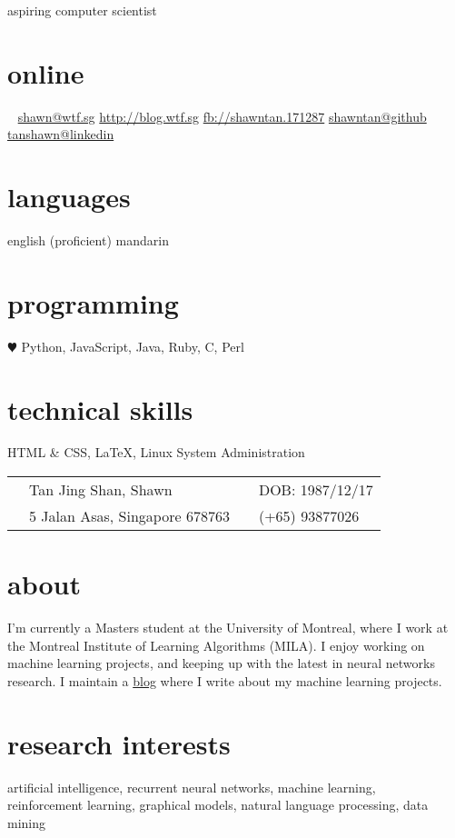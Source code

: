 \documentclass[]{friggeri-cv}
\begin{document}
{aspiring computer scientist

}

\begin{aside}
	\section{online}
	\Email~ \href{mailto:shawn@wtf.sg}{shawn@wtf.sg}
	\href{https://blog.wtf.sg}{http://blog.wtf.sg}
	\href{http://facebook.com/shawntan.171287}{fb://shawntan.171287}
	\href{http://github.com/shawntan}{shawntan@github}
	\href{http://sg.linkedin.com/in/tanshawn}{tanshawn@linkedin}
	\section{languages}
	english (proficient)
	mandarin
	\section{programming}
	{\color{red} $\varheartsuit$} Python, JavaScript, Java, Ruby, C, Perl
	\section{technical skills}
	HTML \& CSS, \LaTeX,
	Linux System Administration
\end{aside}
\begin{tabular}{ p{0.45cm} p{8cm} p{0.45cm} p{6.5cm} }
	\Male 	& Tan Jing Shan, Shawn	 & \Sagittarius &  DOB: 1987/12/17\\
	\Letter & 5 Jalan Asas, Singapore 678763 & \Mobilefone & (+65) 93877026 \\
\end{tabular}


\section{about}
I'm currently a Masters student at the University of Montreal, where I work at 
the Montreal Institute of Learning Algorithms (MILA). I enjoy working on machine 
learning projects, and keeping up with the latest in neural networks research. I 
maintain a \href{http://blog.wtf.sg}{blog} where I write about my machine 
learning projects.


\section{research interests}
artificial intelligence, recurrent neural networks, machine learning,\\
reinforcement learning, graphical models, natural language processing, data 
mining
\end{document}
